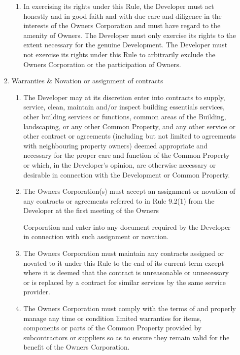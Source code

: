 \documentclass{article}
\begin{document}
\begin{enumerate}[label=\arabic*.]
\begin{enumerate}[label=\arabic{enumi}.\arabic*.]
\begin{enumerate}[label=(\arabic*)]
\item  In exercising its rights under this Rule, the Developer must act honestly and in good faith and with due care and diligence in the interests of the Owners Corporation and must have regard to the amenity of Owners. The Developer must only exercise its rights to the extent necessary for the genuine Development. The Developer must not exercise its rights under this Rule to arbitrarily exclude the Owners Corporation or the participation of Owners.

\end{enumerate}

\item  Warranties \& Novation or assignment of contracts

\begin{enumerate}[label=(\arabic*)]

\item  The Developer may at its discretion enter into contracts to supply, service, clean, maintain and/or inspect building essentials services, other building services or functions, common areas of the Building, landscaping, or any other Common Property, and any other service or other contract or agreements (including but not limited to agreements with neighbouring property owners) deemed appropriate and necessary for the proper care and function of the Common Property or which, in the Developer’s opinion, are otherwise necessary or desirable in connection with the Development or Common Property.

\item  The Owners Corporation(s) must accept an assignment or novation of any contracts or agreements referred to in Rule 9.2(1) from the Developer at the first meeting of the Owners
\newpage

Corporation and enter into any document required by the Developer in connection with such assignment or novation.

\item  The Owners Corporation must maintain any contracts assigned or novated to it under this Rule to the end of its current term except where it is deemed that the contract is unreasonable or unnecessary or is replaced by a contract for similar services by the same service provider.

\item  The Owners Corporation must comply with the terms of and properly manage any time or condition limited warranties for items, components or parts of the Common Property provided by subcontractors or suppliers so as to ensure they remain valid for the benefit of the Owners Corporation.


\end{enumerate}
\end{enumerate}
\end{enumerate}
\end{document}
